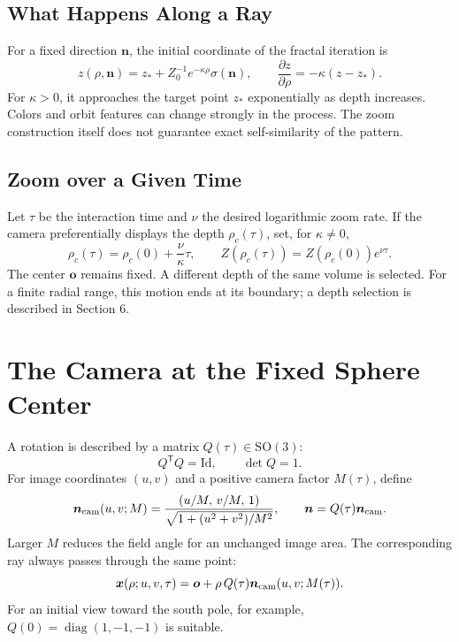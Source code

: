 \documentclass[11pt,a4paper]{article}
\numberwithin{equation}{section}
\newcommand{\vct}[1]{\boldsymbol{#1}}
\newcommand{\SO}{\mathrm{SO}(3)}
\begin{document}
\subsection{What Happens Along a Ray}
For a fixed direction $\vct n$, the initial coordinate of the fractal iteration is
\begin{equation}\label{eq:zray}
 z(\rho,\vct n)=z_\ast+Z_0^{-1}e^{-\kappa\rho}\sigma(\vct n),\qquad
 \frac{\partial z}{\partial\rho}=-\kappa(z-z_\ast).
\end{equation}
For $\kappa>0$, it approaches the target point $z_\ast$ exponentially as depth
increases. Colors and orbit features can change strongly in the process.
The zoom construction itself does not guarantee exact self-similarity of the pattern.

\subsection{Zoom over a Given Time}
Let $\tau$ be the interaction time and $\nu$ the desired logarithmic zoom rate.
If the camera preferentially displays the depth $\rho_c(\tau)$, set, for $\kappa\ne0$,
\begin{equation}
 \rho_c(\tau)=\rho_c(0)+\frac{\nu}{\kappa}\tau,
 \qquad Z(\rho_c(\tau))=Z(\rho_c(0))e^{\nu\tau}.
\end{equation}
The center $\vct o$ remains fixed. A different depth of the same volume is selected.
For a finite radial range, this motion ends at its boundary; a depth selection is
described in Section 6.

\newpage
\section{The Camera at the Fixed Sphere Center}
A rotation is described by a matrix $Q(\tau)\in\SO$:
\[
 Q^{\mathsf T}Q=\mathrm{Id},\qquad\det Q=1.
\]
For image coordinates $(u,v)$ and a positive camera factor $M(\tau)$, define
\begin{equation}\label{eq:camera}
 \vct n_{\rm cam}(u,v;M)=
 \frac{(u/M,\,v/M,\,1)}{\sqrt{1+(u^2+v^2)/M^2}},\qquad
 \vct n=Q(\tau)\vct n_{\rm cam}.
\end{equation}
Larger $M$ reduces the field angle for an unchanged image area.
The corresponding ray always passes through the same point:
\begin{equation}
 \vct x(\rho;u,v,\tau)=\vct o+\rho\,Q(\tau)\vct n_{\rm cam}(u,v;M(\tau)).
\end{equation}
For an initial view toward the south pole, for example,
$Q(0)=\operatorname{diag}(1,-1,-1)$ is suitable.
\end{document}
